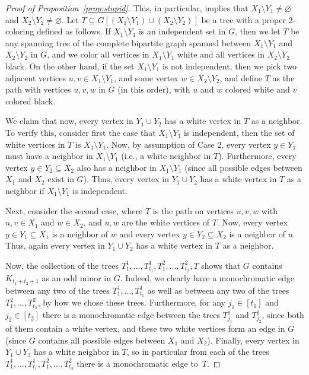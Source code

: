 \documentclass[11pt,reqno,oneside]{amsart}
\theoremstyle{definition}
\newcommand\1{\mathbf{1}}
\newcommand{\su}{\subseteq}
\begin{document}
\begin{proof}[Proof of Proposition~\ref{prop:stupid}]
This, in particular, implies that $X_1\setminus Y_1\neq \varnothing$ and $X_2\setminus Y_2\neq \varnothing$.
Let $T\subseteq G[(X_1\setminus Y_1)\cup (X_2\setminus Y_2)]$ be a tree with a proper $2$-coloring defined as follows. If 
$X_1\setminus Y_1$ is an independent set in $G$, then we let $T$ be any spanning tree of the complete bipartite graph spanned between $X_1\setminus Y_1$ and $X_2\setminus Y_2$ in $G$, and we color all vertices in $X_1\setminus Y_1$ white and all vertices in $X_2\setminus Y_2$ black. On the other hand, if the set $X_1\setminus Y_1$ is not independent, then we pick two adjacent vertices $u,v\in X_1\setminus Y_1$, and some vertex $w\in X_{2}\setminus Y_{2}$, and define $T$ as the path with vertices $u,v,w$ in $G$ (in this order), with $u$ and $w$ colored white and $v$ colored black. 

We claim that now, every vertex in $Y_1\cup Y_2$ has a white vertex in $T$ as a neighbor. To verify this, consider first the case that $X_1\setminus Y_1$ is independent, then the set of white vertices in $T$ is $X_1\setminus Y_1$. Now, by assumption of Case 2, every vertex $y\in Y_1$ must have a neighbor in $X_1\setminus Y_1$ (i.e., a white neighbor in $T$). Furthermore, every vertex $y\in Y_2\su X_2$ also has a neighbor in $X_{1}\setminus Y_{1}$ (since all possible edges between $X_1$ and $X_2$ exist in $G$). Thus, every vertex in $Y_1\cup Y_2$ has a white vertex in $T$ as a neighbor if $X_1\setminus Y_1$ is independent.

Next, consider the second case, where $T$ is the path on vertices $u,v,w$ with $u,v\in X_1$ and $w\in X_{2}$, and $u,w$ are the white vertices of $T$. Now, every vertex $y\in Y_1\su X_1$ is a neighbor of $w$ and every vertex $y\in Y_{2}\su X_{2}$ is a neighbor of $u$. Thus, again every vertex in $Y_1\cup Y_2$ has a white vertex in $T$ as a neighbor.

Now, the collection of the trees $T_1^1,\ldots,T_{t_1}^1, T_1^2,\ldots,T_{t_2}^2, T$ shows that $G$ contains  $K_{t_1+t_2+1}$ as an odd minor in $G$. Indeed, we clearly have a monochromatic edge between any two of the trees $T_1^1,\ldots,T_{t_1}^1$ as well as between any two of the trees $T_1^2,\ldots,T_{t_2}^2$, by how we chose these trees. Furthermore, for any $j_1\in [t_1]$ and $j_2\in [t_2]$ there is a monochromatic edge between the trees $T_{j_1}^1$ and $T_{j_2}^2$, since both of them contain a white vertex, and these two white vertices form an edge in $G$ (since $G$ contains all possible edges between $X_1$ and $X_2$). Finally, every vertex in $Y_1\cup Y_2$ has a white neighbor in $T$, so in particular from each of the trees $T_1^1,\ldots,T_{t_1}^1, T_1^2,\ldots,T_{t_2}^2$ there is a monochromatic edge to~$T$.


\end{proof}
\end{document}
